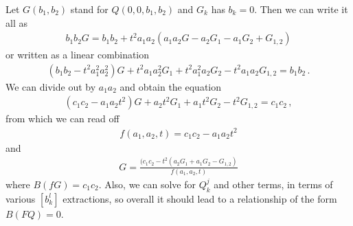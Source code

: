 Let $G(b_1,b_2)$ stand for $Q(0,0,b_1,b_2)$ and $G_k$ has $b_k = 0$. Then we can write it all as
\begin{align}
	b_1b_2 G = b_1b_2 + t^2a_1a_2(a_1a_2G-a_2G_1-a_1G_2+G_{1,2})
\end{align}
or written as a linear combination
\begin{align}
	(b_1b_2-t^2a_1^2a_2^2)G+t^2a_1a_2^2G_1 + t^2a_1^2a_2G_2 - t^2a_1a_2G_{1,2} = b_1b_2\,.
\end{align}
We can divide out by $a_1a_2$ and obtain the equation
\begin{align}
	(c_1c_2-a_1a_2t^2)G + a_2t^2G_1+a_1t^2G_2-t^2G_{1,2}=c_1c_2\,,
\end{align}
from which we can read off
\begin{align}
	f(a_1,a_2,t) = c_1c_2-a_1a_2t^2
\end{align}
and
\begin{align}
	G = \frac{(c_1c_2-t^2(a_2G_1+a_1G_2-G_{1,2})}{f(a_1,a_2,t)}
\end{align}
where $B(fG) = c_1c_2$. Also, we can solve for $Q_k^j$ and other terms, in terms of various $[b_k^l]$ extractions, so overall it should lead to a relationship of the form $B(FQ) = 0$.

